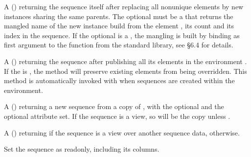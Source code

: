 \documentclass[letterpaper,10pt,english]{sphinxmanual}
\begin{document}
\begin{description}
\sphinxAtStartPar
A  (\sphinxcode{\sphinxupquote{{[}fmt{]}}}) returning the sequence itself after replacing all non\sphinxhyphen{}unique elements by new instances sharing the same parents.
The optional  must be a   that returns the mangled name of the new instance build from the element ,
its count  and its index  in the sequence. If the optional  is a , the mangling  is built by binding 
as first argument to the function  from the standard library, see
 \S{}6.4 for details.

\sphinxAtStartPar
A  () returning the sequence after publishing all its elements in the environment . If the   is
, the method will preserve existing elements from being overridden. This method is automatically invoked with  when sequences
are created within the  environment.

\sphinxAtStartPar
A  (\sphinxcode{\sphinxupquote{{[}name{]}, {[}owner{]}}}) returning a new sequence from a copy of , with the optional  and the optional attribute  set.
If the sequence is a view, so will be the copy unless .

\sphinxAtStartPar
A  () returning  if the sequence is a view over another sequence data,  otherwise.

\sphinxAtStartPar
Set the sequence as read\sphinxhyphen{}only, including its columns.


\end{description}
\end{document}
